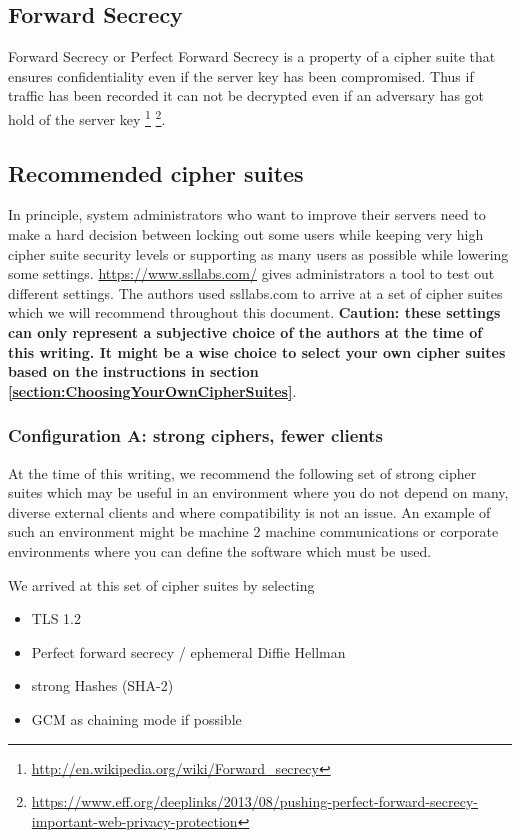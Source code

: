 \subsection{Forward Secrecy}
Forward Secrecy or Perfect Forward Secrecy is a property of a cipher suite 
that ensures confidentiality even if the server key has been compromised.
Thus if traffic has been recorded it can not be decrypted even if an adversary
has got hold of the server key
\footnote{\url{http://en.wikipedia.org/wiki/Forward\_secrecy}}
\footnote{\url{https://www.eff.org/deeplinks/2013/08/pushing-perfect-forward-secrecy-important-web-privacy-protection}}. 

\subsection{Recommended cipher suites}
\label{section:recommendedciphers}

In principle, system administrators who want to improve their servers need to
make a hard decision between locking out some users while keeping very high
cipher suite security levels or supporting as many users as possible while
lowering some settings. \url{https://www.ssllabs.com/} gives administrators a
tool to test out different settings. The authors used ssllabs.com to arrive at
a set of cipher suites which we will recommend throughout this document.
\textbf{Caution: these settings can only represent a subjective choice of the
authors at the time of this writing. It might be a wise choice to select your
own cipher suites based on the instructions in section
\ref{section:ChoosingYourOwnCipherSuites}}.


\subsubsection{Configuration A: strong ciphers, fewer clients}

At the time of this writing, we recommend the following set of strong cipher
suites which may be useful in an environment where you do not depend on many,
diverse external clients and where compatibility is not an issue.  An example
of such an environment might be machine 2 machine communications or corporate
environments where you can define the software which must be used.


We arrived at this set of cipher suites by selecting

\begin{itemize}
\item TLS 1.2
\item Perfect forward secrecy / ephemeral Diffie Hellman
\item strong Hashes (SHA-2)
\item GCM as chaining mode if possible 
\end{itemize}

